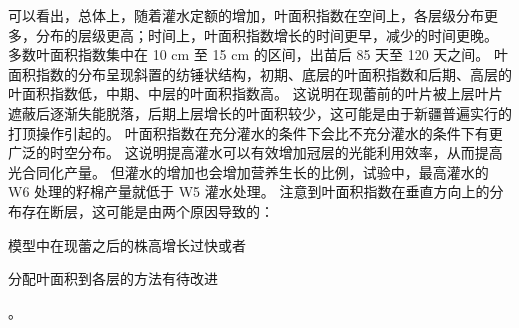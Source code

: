 可以看出，总体上，随着灌水定额的增加，叶面积指数在空间上，各层级分布更多，分布的层级更高；时间上，叶面积指数增长的时间更早，减少的时间更晚。%
多数叶面积指数集中在 10 cm 至 15 cm 的区间，出苗后 85 天至 120 天之间。%
叶面积指数的分布呈现斜置的纺锤状结构，初期、底层的叶面积指数和后期、高层的叶面积指数低，中期、中层的叶面积指数高。%
这说明在现蕾前的叶片被上层叶片遮蔽后逐渐失能脱落，后期上层增长的叶面积较少，这可能是由于新疆普遍实行的打顶操作引起的。%
叶面积指数在充分灌水的条件下会比不充分灌水的条件下有更广泛的时空分布。%
这说明提高灌水可以有效增加冠层的光能利用效率，从而提高光合同化产量。%
但灌水的增加也会增加营养生长的比例，试验中，最高灌水的 W6 处理的籽棉产量就低于 W5 灌水处理。
注意到叶面积指数在垂直方向上的分布存在断层，这可能是由两个原因导致的：\begin{enumerate*}
    \item 模型中在现蕾之后的株高增长过快或者
    \item 分配叶面积到各层的方法有待改进
\end{enumerate*}。